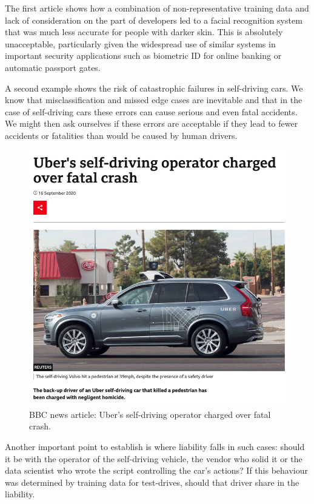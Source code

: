 \documentclass[
  letterpaper,
  DIV=11,
  numbers=noendperiod]{scrreprt}
\begin{document}
The first article shows how a combination of non-representative training
data and lack of consideration on the part of developers led to a facial
recognition system that was much less accurate for people with darker
skin. This is absolutely unacceptable, particularly given the widespread
use of similar systems in important security applications such as
biometric ID for online banking or automatic passport gates.

A second example shows the risk of catastrophic failures in self-driving
cars. We know that misclassification and missed edge cases are
inevitable and that in the case of self-driving cars these errors can
cause serious and even fatal accidents. We might then ask ourselves if
these errors are acceptable if they lead to fewer accidents or
fatalities than would be caused by human drivers.

\begin{figure}[H]

{\centering \includegraphics{images/503-ethics-conduct/bbc-self-driving_1.png}

}

\caption{BBC news article: Uber's self-driving operator charged over
fatal crash.}

\end{figure}%

Another important point to establish is where liability falls in such
cases: should it be with the operator of the self-driving vehicle, the
vendor who solid it or the data scientist who wrote the script
controlling the car's actions? If this behaviour was determined by
training data for test-drives, should that driver share in the
liability.
\end{document}
